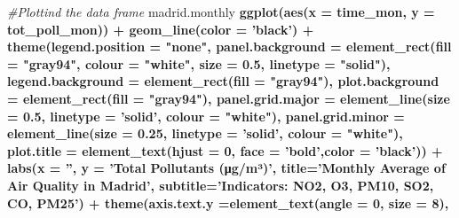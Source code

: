 \documentclass[
]{article}
\newenvironment{Shaded}{\begin{snugshade}}{\end{snugshade}}
\newcommand{\CommentTok}[1]{\textcolor[rgb]{0.56,0.35,0.01}{\textit{#1}}}
\newcommand{\DataTypeTok}[1]{\textcolor[rgb]{0.13,0.29,0.53}{#1}}
\newcommand{\DecValTok}[1]{\textcolor[rgb]{0.00,0.00,0.81}{#1}}
\newcommand{\FloatTok}[1]{\textcolor[rgb]{0.00,0.00,0.81}{#1}}
\newcommand{\KeywordTok}[1]{\textcolor[rgb]{0.13,0.29,0.53}{\textbf{#1}}}
\newcommand{\NormalTok}[1]{#1}
\newcommand{\OperatorTok}[1]{\textcolor[rgb]{0.81,0.36,0.00}{\textbf{#1}}}
\newcommand{\StringTok}[1]{\textcolor[rgb]{0.31,0.60,0.02}{#1}}
\begin{document}
\begin{Shaded}
\begin{Highlighting}[]
{{{{\CommentTok{#Plottind the data frame}
\NormalTok{madrid.monthly }\OperatorTok{%>%}\StringTok{ }
\StringTok{  }\KeywordTok{ggplot}\NormalTok{(}\KeywordTok{aes}\NormalTok{(}\DataTypeTok{x =}\NormalTok{ time_mon, }
             \DataTypeTok{y =}\NormalTok{ tot_poll_mon)) }\OperatorTok{+}\StringTok{ }
\StringTok{    }\KeywordTok{geom_line}\NormalTok{(}\DataTypeTok{color =} \StringTok{'black'}\NormalTok{) }\OperatorTok{+}
\StringTok{    }\KeywordTok{theme}\NormalTok{(}\DataTypeTok{legend.position =} \StringTok{"none"}\NormalTok{,}
          \DataTypeTok{panel.background =} \KeywordTok{element_rect}\NormalTok{(}\DataTypeTok{fill =} \StringTok{"gray94"}\NormalTok{, }\DataTypeTok{colour =} \StringTok{"white"}\NormalTok{,}
                                      \DataTypeTok{size =} \FloatTok{0.5}\NormalTok{, }\DataTypeTok{linetype =} \StringTok{"solid"}\NormalTok{),}
          \DataTypeTok{legend.background =} \KeywordTok{element_rect}\NormalTok{(}\DataTypeTok{fill =} \StringTok{"gray94"}\NormalTok{),}
          \DataTypeTok{plot.background =} \KeywordTok{element_rect}\NormalTok{(}\DataTypeTok{fill =} \StringTok{"gray94"}\NormalTok{),}
          \DataTypeTok{panel.grid.major =} \KeywordTok{element_line}\NormalTok{(}\DataTypeTok{size =} \FloatTok{0.5}\NormalTok{, }\DataTypeTok{linetype =} \StringTok{'solid'}\NormalTok{, }\DataTypeTok{colour =}                                            \StringTok{"white"}\NormalTok{), }
          \DataTypeTok{panel.grid.minor =} \KeywordTok{element_line}\NormalTok{(}\DataTypeTok{size =} \FloatTok{0.25}\NormalTok{, }\DataTypeTok{linetype =} \StringTok{'solid'}\NormalTok{, }\DataTypeTok{colour =}                                           \StringTok{"white"}\NormalTok{),  }
          \DataTypeTok{plot.title =} \KeywordTok{element_text}\NormalTok{(}\DataTypeTok{hjust =} \DecValTok{0}\NormalTok{, }\DataTypeTok{face =} \StringTok{'bold'}\NormalTok{,}\DataTypeTok{color =} \StringTok{'black'}\NormalTok{)) }\OperatorTok{+}
\StringTok{    }\KeywordTok{labs}\NormalTok{(}\DataTypeTok{x =} \StringTok{''}\NormalTok{, }
         \DataTypeTok{y =} \StringTok{'Total Pollutants (μg/m³)'}\NormalTok{,}
         \DataTypeTok{title=}\StringTok{'Monthly Average of Air Quality in Madrid'}\NormalTok{,}
         \DataTypeTok{subtitle=}\StringTok{'Indicators: NO2, O3, PM10, SO2, CO, PM25'}\NormalTok{) }\OperatorTok{+}
\StringTok{    }\KeywordTok{theme}\NormalTok{(}\DataTypeTok{axis.text.y =}\KeywordTok{element_text}\NormalTok{(}\DataTypeTok{angle =} \DecValTok{0}\NormalTok{,}
                                    \DataTypeTok{size =} \DecValTok{8}\NormalTok{),}
}}}}}
\end{Highlighting}
\end{Shaded}
\end{document}
